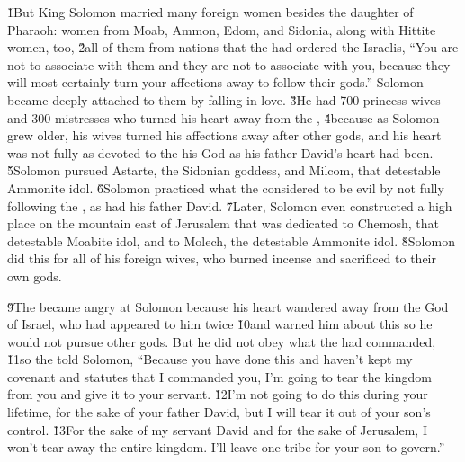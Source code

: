 \v{1}But King Solomon married many foreign women besides the daughter of Pharaoh: women from Moab, Ammon, Edom, and Sidonia, along with Hittite women, too, \v{2}all of them from nations that the  had ordered the Israelis, ``You are not to associate with them and they are not to associate with you, because they will most certainly turn your affections away to follow their gods.'' Solomon became deeply attached to them by falling in love. \v{3}He had 700 princess wives and 300 mistresses who turned his heart away from the , \v{4}because as Solomon grew older, his wives turned his affections away after other gods, and his heart was not fully as devoted to the  his God as his father David's heart had been. \v{5}Solomon pursued Astarte, the Sidonian goddess, and Milcom, that detestable Ammonite idol. \v{6}Solomon practiced what the  considered to be evil by not fully following the , as had his father David. \v{7}Later, Solomon even constructed a high place on the mountain east of Jerusalem that was dedicated to Chemosh, that detestable Moabite idol, and to Molech, the detestable Ammonite idol. \v{8}Solomon did this for all of his foreign wives, who burned incense and sacrificed to their own gods.

\v{9}The  became angry at Solomon because his heart wandered away from the  God of Israel, who had appeared to him twice \v{10}and warned him about this so he would not pursue other gods. But he did not obey what the  had commanded, \v{11}so the  told Solomon, ``Because you have done this and haven't kept my covenant and statutes that I commanded you, I'm going to tear the kingdom from you and give it to your servant. \v{12}I'm not going to do this during your lifetime, for the sake of your father David, but I will tear it out of your son's control. \v{13}For the sake of my servant David and for the sake of Jerusalem, I won't tear away the entire kingdom. I'll leave one tribe for your son to govern.''

